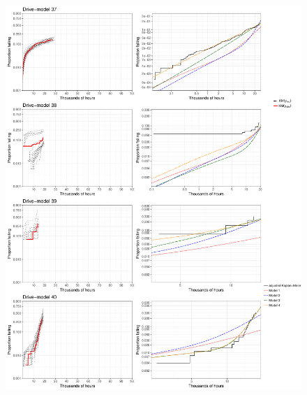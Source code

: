 \documentclass[12pt]{article}
\begin{document}
\begin{figure}[H]
\includegraphics[width=\textwidth]{ppcheck-v3-10.pdf}
\end{figure}
\end{document}
